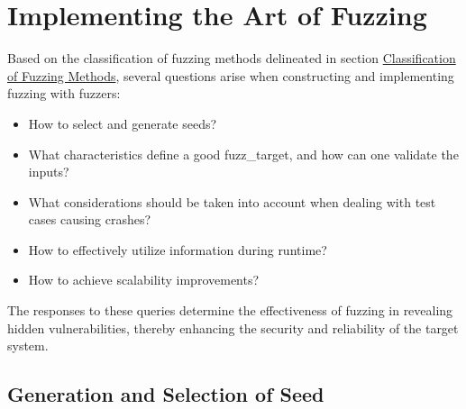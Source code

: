 



\section{Implementing the Art of Fuzzing}
Based on the classification of fuzzing methods delineated in
section \hyperref[sec:fuzzing_methods]{Classification of Fuzzing Methods},
several questions arise when constructing and implementing fuzzing with
fuzzers\cite{liang2018fuzzing}:

\begin{itemize}
\item How to select and generate seeds?
\item What characteristics define a good \gls{fuzz_target}, and how can one validate the inputs?
\item What considerations should be taken into account when dealing with test cases causing crashes?
\item How to effectively utilize information during runtime?
\item How to achieve scalability improvements?
\end{itemize}
The responses to these queries determine the effectiveness of fuzzing in
revealing hidden vulnerabilities, thereby enhancing the security and reliability of the target system.

\subsection{Generation and Selection of Seed}

